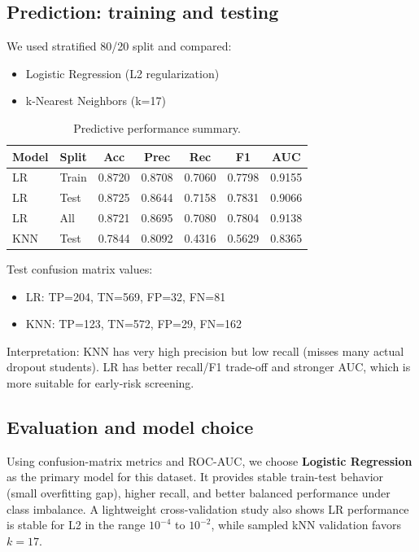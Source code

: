 \documentclass{article}
\begin{document}
\subsection{Prediction: training and testing}
We used stratified 80/20 split and compared:
\begin{itemize}
    \item Logistic Regression (L2 regularization)
    \item k-Nearest Neighbors (k=17)
\end{itemize}

\begin{table}[h]
\centering
\caption{Predictive performance summary.}
\begin{tabular}{llccccc}
\toprule
Model & Split & Acc & Prec & Rec & F1 & AUC \\
\midrule
LR & Train & 0.8720 & 0.8708 & 0.7060 & 0.7798 & 0.9155 \\
LR & Test & 0.8725 & 0.8644 & 0.7158 & 0.7831 & 0.9066 \\
LR & All & 0.8721 & 0.8695 & 0.7080 & 0.7804 & 0.9138 \\
KNN & Test & 0.7844 & 0.8092 & 0.4316 & 0.5629 & 0.8365 \\
\bottomrule
\end{tabular}
\end{table}

Test confusion matrix values:
\begin{itemize}
    \item LR: TP=204, TN=569, FP=32, FN=81
    \item KNN: TP=123, TN=572, FP=29, FN=162
\end{itemize}

Interpretation: KNN has very high precision but low recall (misses many actual dropout students). LR has better recall/F1 trade-off and stronger AUC, which is more suitable for early-risk screening.

\subsection{Evaluation and model choice}
Using confusion-matrix metrics and ROC-AUC, we choose \textbf{Logistic Regression} as the primary model for this dataset. It provides stable train-test behavior (small overfitting gap), higher recall, and better balanced performance under class imbalance. A lightweight cross-validation study also shows LR performance is stable for L2 in the range $10^{-4}$ to $10^{-2}$, while sampled kNN validation favors $k=17$.
\end{document}
